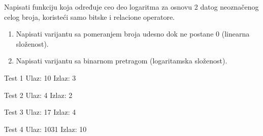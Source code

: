 \begin{Exercise}[label=405]
  Napisati funkciju koja određuje ceo deo logaritma za osnovu 2 datog
  neoznačenog celog broja, koristeći samo bitske i relacione
  operatore.
  \begin{enumerate}
  \item Napisati varijantu sa pomeranjem broja udesno dok ne postane 0
    (linearna složenost).
  \item Napisati varijantu sa binarnom pretragom (logaritamska složenost).
  \end{enumerate}
  
\begin{minitest}
\begin{test}{Test 1}
Ulaz:       10
Izlaz:      3
\end{test}
\end{minitest}
\begin{minitest}
\begin{test}{Test 2}
Ulaz:       4
Izlaz:      2
\end{test}
\end{minitest}
\begin{minitest}
\begin{test}{Test 3}
Ulaz:       17
Izlaz:      4
\end{test}
\end{minitest}

\begin{minitest}
\begin{test}{Test 4}
Ulaz:       1031
Izlaz:      10
\end{test}
\end{minitest}
  
\end{Exercise}


